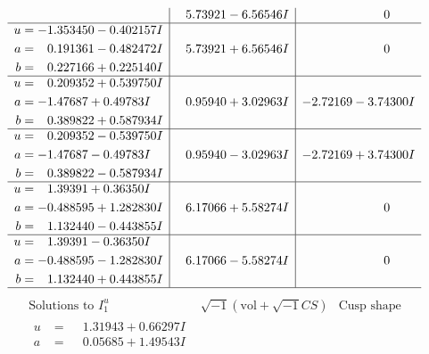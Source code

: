\documentclass[1p]{elsarticle_modified}
\theoremstyle{definition}
\newcommand{\I}{\sqrt{-1}}
\begin{document}
$$\begin{array}{c|c|c}
 & \phantom{-}5.73921 - 6.56546 I & \phantom{-0.000000 } 0 \\ \hline\begin{aligned}
u &= -1.353450 - 0.402157 I \\
a &= \phantom{-}0.191361 - 0.482472 I \\
b &= \phantom{-}0.227166 + 0.225140 I\end{aligned}
 & \phantom{-}5.73921 + 6.56546 I & \phantom{-0.000000 } 0 \\ \hline\begin{aligned}
u &= \phantom{-}0.209352 + 0.539750 I \\
a &= -1.47687 + 0.49783 I \\
b &= \phantom{-}0.389822 + 0.587934 I\end{aligned}
 & \phantom{-}0.95940 + 3.02963 I & -2.72169 - 3.74300 I \\ \hline\begin{aligned}
u &= \phantom{-}0.209352 - 0.539750 I \\
a &= -1.47687 - 0.49783 I \\
b &= \phantom{-}0.389822 - 0.587934 I\end{aligned}
 & \phantom{-}0.95940 - 3.02963 I & -2.72169 + 3.74300 I \\ \hline\begin{aligned}
u &= \phantom{-}1.39391 + 0.36350 I \\
a &= -0.488595 + 1.282830 I \\
b &= \phantom{-}1.132440 - 0.443855 I\end{aligned}
 & \phantom{-}6.17066 + 5.58274 I & \phantom{-0.000000 } 0 \\ \hline\begin{aligned}
u &= \phantom{-}1.39391 - 0.36350 I \\
a &= -0.488595 - 1.282830 I \\
b &= \phantom{-}1.132440 + 0.443855 I\end{aligned}
 & \phantom{-}6.17066 - 5.58274 I & \phantom{-0.000000 } 0\\
 \hline 
 \end{array}$$\newpage$$\begin{array}{c|c|c}  
\text{Solutions to }I^u_{1}& \I (\text{vol} + \sqrt{-1}CS) & \text{Cusp shape}\\
 \hline 
\begin{aligned}
u &= \phantom{-}1.31943 + 0.66297 I \\
a &= \phantom{-}0.05685 + 1.49543 I \\

\end{aligned}
\end{array}$$
\end{document}
